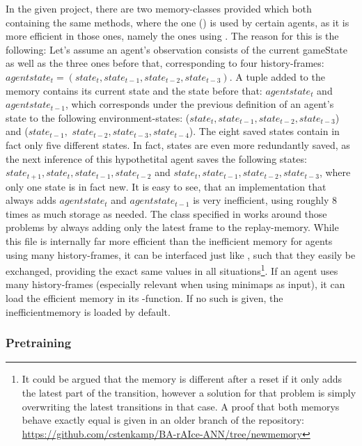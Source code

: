 In the given project, there are two memory-classes provided which both containing the same methods, where the one () is used by certain agents, as it is more efficient in those ones, namely the ones using . 
The reason for this is the following: 
Let's assume an agent's observation consists of the current gameState as well as the three ones before that, corresponding to four history-frames: $agentstate_t = (state_t, state_{t-1}, state_{t-2}, state_{t-3})$. A tuple added to the memory contains its current state and the state before that: $agentstate_t$ and $agentstate_{t-1}$, which corresponds under the previous definition of an agent's state to the following environment-states: ($state_t, state_{t-1}, state_{t-2}, state_{t-3}$) and ($state_{t-1}, $ $state_{t-2}, state_{t-3}, state_{t-4}$). The eight saved states contain in fact only five different states. In fact, states are even more redundantly saved, as the next inference of this hypothetital agent saves the following states: 
$state_{t+1}, state_{t}, state_{t-1}, state_{t-2}$ and $state_{t}, state_{t-1}, state_{t-2}, state_{t-3}$, where only one state is in fact new. It is easy to see, that an implementation that always adds $agentstate_t$ and $agentstate_{t-1}$ is very inefficient, using roughly 8 times as much storage as needed. The class specified in  works around those problems by always adding only the latest frame to the replay-memory. While this file is internally far more efficient than the inefficient memory for agents using many history-frames, it can be interfaced just like , such that they easily be exchanged, providing the exact same values in all situations\footnote{It could be argued that the memory is different after a reset if it only adds the latest part of the transition, however a solution for that problem is simply overwriting the latest transitions in that case. A proof that both memorys behave exactly equal is given in an older branch of the repository: \url{https://github.com/cstenkamp/BA-rAIce-ANN/tree/newmemory}}.
If an agent uses many history-frames (especially relevant when using minimaps as input), it can load the efficient memory in its -function. If no such is given, the inefficientmemory is loaded by default. 

\subsubsection{Pretraining}

